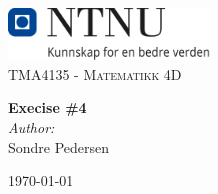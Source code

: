 

\begin{titlepage}
    \vbox{ }
    \vbox{ }
    \begin{center}
        \includegraphics[width=0.40\textwidth]{img/NTNU_logo.png}\\[1cm]
    \textsc{\Large TMA4135 - Matematikk 4D}\\[0.5cm]
    \vbox{ }
    
    { \huge \bfseries Execise \#4}\\[0.4cm]
    
    \large
    \emph{Author:}\\
    Sondre Pedersen
    \vfill
    
    {\large\today}
\end{center}
\end{titlepage}